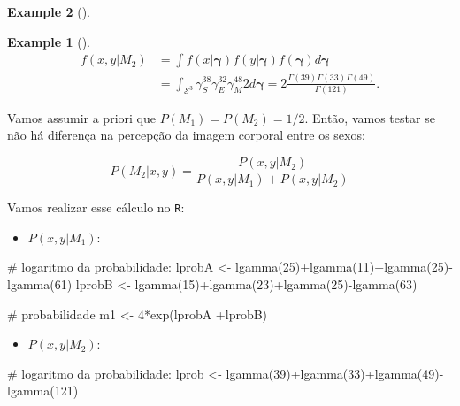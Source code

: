\documentclass[
  letterpaper,
  DIV=11,
  numbers=noendperiod]{scrreprt}
\newenvironment{Shaded}{\begin{snugshade}}{\end{snugshade}}
\newcommand{\CommentTok}[1]{\textcolor[rgb]{0.37,0.37,0.37}{#1}}
\newcommand{\DecValTok}[1]{\textcolor[rgb]{0.68,0.00,0.00}{#1}}
\newcommand{\FunctionTok}[1]{\textcolor[rgb]{0.28,0.35,0.67}{#1}}
\newcommand{\NormalTok}[1]{\textcolor[rgb]{0.00,0.23,0.31}{#1}}
\newcommand{\OtherTok}[1]{\textcolor[rgb]{0.00,0.23,0.31}{#1}}
\newcommand{\SpecialCharTok}[1]{\textcolor[rgb]{0.37,0.37,0.37}{#1}}
\providecommand{\tightlist}{%
  \setlength{\itemsep}{0pt}\setlength{\parskip}{0pt}}\usepackage{longtable,booktabs,array}
\theoremstyle{definition}
\theoremstyle{plain}
\theoremstyle{definition}
\newtheorem{example}{Example}[chapter]
\theoremstyle{remark}
\begin{document}
\begin{example}[]
\begin{example}[]
\[\begin{align}f(x,y|M_2)&=\int f(x|\boldsymbol{\gamma})f(y|\boldsymbol{\gamma})f(\boldsymbol{\gamma})d\boldsymbol{\gamma}\\&=\int_{\mathcal{S}^3}\gamma_S^{38}\gamma_E^{32}\gamma_{M}^{48}2d\boldsymbol{\gamma}=2\frac{\Gamma(39)\Gamma(33)\Gamma(49)}{\Gamma(121)}.\end{align}\]

Vamos assumir a priori que \(P(M_1)=P(M_2)=1/2\). Então, vamos testar se
não há diferença na percepção da imagem corporal entre os sexos:

\[P(M_2|x,y)=\frac{P(x,y|M_2)}{P(x,y|M_1)+P(x,y|M_2)}\]

Vamos realizar esse cálculo no \texttt{R}:

\begin{itemize}
\tightlist
\item
  \(P(x,y|M_1)\):
\end{itemize}

\begin{Shaded}
\begin{Highlighting}[]
\CommentTok{\# logaritmo da probabilidade:}
\NormalTok{lprobA }\OtherTok{\textless{}{-}} \FunctionTok{lgamma}\NormalTok{(}\DecValTok{25}\NormalTok{)}\SpecialCharTok{+}\FunctionTok{lgamma}\NormalTok{(}\DecValTok{11}\NormalTok{)}\SpecialCharTok{+}\FunctionTok{lgamma}\NormalTok{(}\DecValTok{25}\NormalTok{)}\SpecialCharTok{{-}}\FunctionTok{lgamma}\NormalTok{(}\DecValTok{61}\NormalTok{)}
\NormalTok{lprobB }\OtherTok{\textless{}{-}} \FunctionTok{lgamma}\NormalTok{(}\DecValTok{15}\NormalTok{)}\SpecialCharTok{+}\FunctionTok{lgamma}\NormalTok{(}\DecValTok{23}\NormalTok{)}\SpecialCharTok{+}\FunctionTok{lgamma}\NormalTok{(}\DecValTok{25}\NormalTok{)}\SpecialCharTok{{-}}\FunctionTok{lgamma}\NormalTok{(}\DecValTok{63}\NormalTok{)}

\CommentTok{\# probabilidade}
\NormalTok{m1 }\OtherTok{\textless{}{-}} \DecValTok{4}\SpecialCharTok{*}\FunctionTok{exp}\NormalTok{(lprobA }\SpecialCharTok{+}\NormalTok{lprobB)}
\end{Highlighting}
\end{Shaded}

\begin{itemize}
\tightlist
\item
  \(P(x,y|M_2)\):
\end{itemize}

\begin{Shaded}
\begin{Highlighting}[]
\CommentTok{\# logaritmo da probabilidade:}
\NormalTok{lprob }\OtherTok{\textless{}{-}} \FunctionTok{lgamma}\NormalTok{(}\DecValTok{39}\NormalTok{)}\SpecialCharTok{+}\FunctionTok{lgamma}\NormalTok{(}\DecValTok{33}\NormalTok{)}\SpecialCharTok{+}\FunctionTok{lgamma}\NormalTok{(}\DecValTok{49}\NormalTok{)}\SpecialCharTok{{-}}\FunctionTok{lgamma}\NormalTok{(}\DecValTok{121}\NormalTok{)}


\end{Highlighting}
\end{Shaded}
\end{example}
\end{example}
\end{document}
